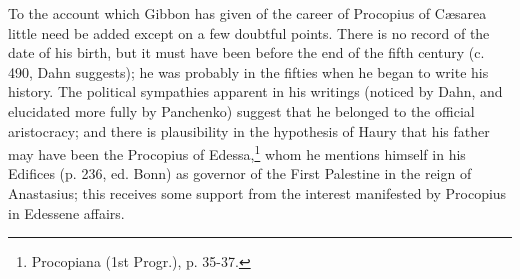 To the account which Gibbon has given of the career of Procopius of Cæsarea little need be added except on a few doubtful points. There is no record of the date of his birth, but it must have been before the end of the fifth century (c. 490, Dahn suggests); he was probably in the fifties when he began to write his history. The political sympathies apparent in his writings (noticed by Dahn, and elucidated more fully by Panchenko) suggest that he belonged to the official aristocracy; and there is plausibility in the hypothesis of Haury that his father may have been the Procopius of Edessa,\footnote{Procopiana (1st Progr.), p. 35-37.} whom he mentions himself in his Edifices (p. 236, ed. Bonn) as governor of the First Palestine in the reign of Anastasius; this receives some support from the interest manifested by Procopius in Edessene affairs.

